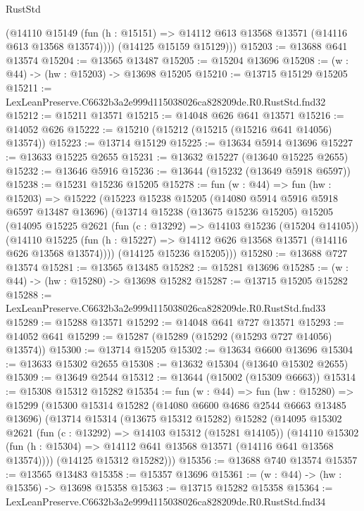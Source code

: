 \begin{lexlean}{RustStd}
\begin{coremodule}
          (@14110
            @15149
            (fun (h : @15151) => @14112 @613 @13568 @13571 (@14116 @613 @13568 @13574))))
        (@14125 @15159 @15129)))
@15203 := @13688 @641 @13574
@15204 := @13565 @13487
@15205 := @15204 @13696
@15208 := (w : @44) -> (hw : @15203) -> @13698 @15205
@15210 := @13715 @15129 @15205
@15211 := LexLeanPreserve.C6632b3a2e999d115038026ca828209de.R0.RustStd.fnd32
@15212 := @15211 @13571
@15215 := @14048 @626 @641 @13571
@15216 := @14052 @626
@15222 := @15210 (@15212 (@15215 (@15216 @641 @14056) @13574))
@15223 := @13714 @15129
@15225 := @13634 @5914 @13696
@15227 := @13633 @15225 @2655
@15231 := @13632 @15227 (@13640 @15225 @2655)
@15232 := @13646 @5916
@15236 := @13644 (@15232 (@13649 @5918 @6597))
@15238 := @15231 @15236 @15205
@15278 := fun (w : @44) =>
  fun (hw : @15203) =>
  @15222
    (@15223
      @15238
      @15205
      (@14080 @5914 @5916 @5918 @6597 @13487 @13696)
      (@13714
        @15238
        (@13675 @15236 @15205)
        @15205
        (@14095
          @15225
          @2621
          (fun (c : @13292) => @14103 @15236 (@15204 @14105))
          (@14110
            @15225
            (fun (h : @15227) => @14112 @626 @13568 @13571 (@14116 @626 @13568 @13574))))
        (@14125 @15236 @15205)))
@15280 := @13688 @727 @13574
@15281 := @13565 @13485
@15282 := @15281 @13696
@15285 := (w : @44) -> (hw : @15280) -> @13698 @15282
@15287 := @13715 @15205 @15282
@15288 := LexLeanPreserve.C6632b3a2e999d115038026ca828209de.R0.RustStd.fnd33
@15289 := @15288 @13571
@15292 := @14048 @641 @727 @13571
@15293 := @14052 @641
@15299 := @15287 (@15289 (@15292 (@15293 @727 @14056) @13574))
@15300 := @13714 @15205
@15302 := @13634 @6600 @13696
@15304 := @13633 @15302 @2655
@15308 := @13632 @15304 (@13640 @15302 @2655)
@15309 := @13649 @2544
@15312 := @13644 (@15002 (@15309 @6663))
@15314 := @15308 @15312 @15282
@15354 := fun (w : @44) =>
  fun (hw : @15280) =>
  @15299
    (@15300
      @15314
      @15282
      (@14080 @6600 @4686 @2544 @6663 @13485 @13696)
      (@13714
        @15314
        (@13675 @15312 @15282)
        @15282
        (@14095
          @15302
          @2621
          (fun (c : @13292) => @14103 @15312 (@15281 @14105))
          (@14110
            @15302
            (fun (h : @15304) => @14112 @641 @13568 @13571 (@14116 @641 @13568 @13574))))
        (@14125 @15312 @15282)))
@15356 := @13688 @740 @13574
@15357 := @13565 @13483
@15358 := @15357 @13696
@15361 := (w : @44) -> (hw : @15356) -> @13698 @15358
@15363 := @13715 @15282 @15358
@15364 := LexLeanPreserve.C6632b3a2e999d115038026ca828209de.R0.RustStd.fnd34

\end{coremodule}
\end{lexlean}
